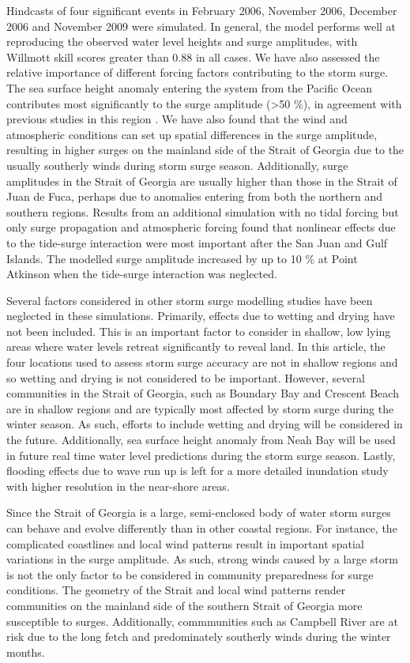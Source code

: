 \documentclass[pdftex,10pt]{article}
\begin{document}
Hindcasts of four significant events in February 2006, November 2006, December 2006 and November 2009 were simulated. In general, the model performs well at reproducing the observed water level heights and surge amplitudes, with Willmott skill scores greater than 0.88 in all cases. We have also assessed the relative importance of different forcing factors contributing to the storm surge. The sea surface height anomaly entering the system from the Pacific Ocean contributes most significantly to the surge amplitude (>50 \%), in agreement with previous studies in this region \citep{murty1995storm}. We have also found that the wind and atmospheric conditions can set up spatial differences in the surge amplitude, resulting in higher surges on the mainland side of the Strait of Georgia due to the usually southerly winds during storm surge season. Additionally, surge amplitudes in the Strait of Georgia are usually higher than those in the Strait of Juan de Fuca, perhaps due to anomalies entering from both the northern and southern regions. Results from an additional simulation with no tidal forcing but only surge propagation and atmospheric forcing found that nonlinear effects due to the tide-surge interaction were most important after the San Juan and Gulf Islands. The modelled surge amplitude increased by up to 10 \% at Point Atkinson when the tide-surge interaction was neglected. 

Several factors considered in other storm surge modelling studies have been neglected in these simulations. Primarily, effects due to wetting and drying have not been included. This is an important factor to consider in shallow, low lying areas where water levels retreat significantly to reveal land. In this article, the four locations used to assess storm surge accuracy are not in shallow regions and so wetting and drying is not considered to be important. However, several communities in the Strait of Georgia, such as Boundary Bay and Crescent Beach are in shallow regions and are typically most affected by storm surge during the winter season. As such, efforts to include wetting and drying will be considered in the future. Additionally, sea surface height anomaly from Neah Bay will be used in future real time water level predictions during the storm surge season. Lastly, flooding effects due to wave run up is left for a more detailed inundation study with higher resolution in the near-shore areas. 

Since the Strait of Georgia is a large, semi-enclosed body of water storm surges can behave and evolve differently than in other coastal regions. For instance, the complicated coastlines and local wind patterns result in important spatial variations in the surge amplitude. As such, strong winds caused by a large storm is not the only factor to be considered in community preparedness for surge conditions. The geometry of the Strait and local wind patterns render communities on the mainland side of the southern Strait of Georgia more susceptible to surges. Additionally, commmunities such as Campbell River are at risk due to the long fetch and predominately southerly winds during the winter months.
\end{document}
